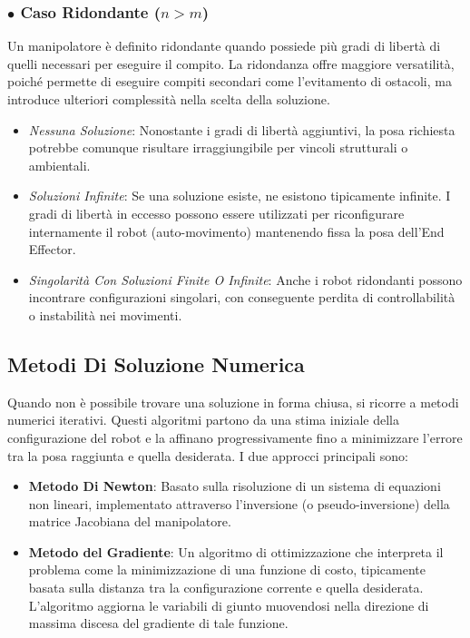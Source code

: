 \documentclass[11pt, a4paper]{report}
\begin{document}
\subsubsection*{\(\bullet\) Caso Ridondante ($n > m$)}
Un manipolatore è definito ridondante quando possiede più gradi di libertà di quelli  necessari per eseguire il compito. La ridondanza offre maggiore versatilità, poiché permette di eseguire compiti secondari come l'evitamento di ostacoli, ma introduce ulteriori complessità nella scelta della soluzione.
\begin{itemize}
    \item \textit{Nessuna Soluzione}: Nonostante i gradi di libertà aggiuntivi, la posa richiesta potrebbe comunque risultare irraggiungibile per vincoli strutturali o ambientali.
    \item \textit{Soluzioni Infinite}: Se una soluzione esiste, ne esistono tipicamente infinite. I gradi di libertà in eccesso possono essere utilizzati per riconfigurare internamente il robot (auto-movimento) mantenendo fissa la posa dell'End Effector.
    \item \textit{Singolarità Con Soluzioni Finite O Infinite}: Anche i robot ridondanti possono incontrare configurazioni singolari, con conseguente perdita di controllabilità o instabilità nei movimenti.
\end{itemize}


\subsection{Metodi Di Soluzione Numerica}
Quando non è possibile trovare una soluzione in forma chiusa, si ricorre a metodi numerici iterativi. Questi algoritmi partono da una stima iniziale della configurazione del robot e la affinano progressivamente fino a minimizzare l'errore tra la posa raggiunta e quella desiderata. I due approcci principali sono:
\begin{itemize}
    \item \textbf{Metodo Di Newton}: Basato sulla risoluzione di un sistema di equazioni non lineari, implementato attraverso l'inversione (o pseudo-inversione) della matrice Jacobiana del manipolatore.
    \item \textbf{Metodo del Gradiente}: Un algoritmo di ottimizzazione che interpreta il problema come la minimizzazione di una funzione di costo, tipicamente basata sulla distanza tra la configurazione corrente e quella desiderata. L'algoritmo aggiorna le variabili di giunto muovendosi nella direzione di massima discesa del gradiente di tale funzione.
\end{itemize}
\end{document}
